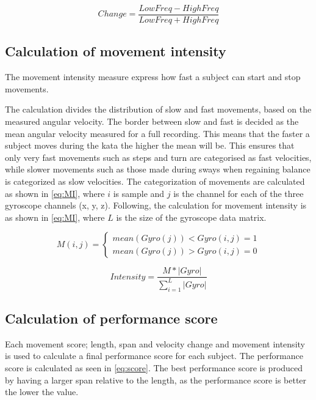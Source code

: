 \begin{equation} \label{eq:VC}
Change = \frac{LowFreq-HighFreq}{LowFreq+HighFreq}
\end{equation}


\subsection{Calculation of movement intensity}
The movement intensity measure express how fast a subject can start and stop movements. 

The calculation divides the distribution of slow and fast movements, based on the measured angular velocity. The border between slow and fast is decided as the mean angular velocity measured for a full recording. This means that the faster a subject moves during the kata the higher the mean will be. This ensures that only very fast movements such as steps and turn are categorised as fast velocities, while slower movements such as those made during sways when regaining balance is categorized as slow velocities. The categorization of movements are calculated as shown in \eqref{eq:MI}, where $i$ is sample and $j$ is the channel for each of the three gyroscope channels (x, y, z). Following, the calculation for movement intensity is as shown in \eqref{eq:MI}, where $L$ is the size of the gyroscope data matrix.

\begin{equation} \label{eq:category}
M(i,j) = \left \{
\begin{matrix}
{mean(Gyro(j)) < Gyro(i,j) = 1}\\{mean(Gyro(j)) > Gyro(i,j) = 0}
\end{matrix} \right.
\end{equation}



%


\begin{equation} \label{eq:MI}
Intensity = \frac{M*\left| Gyro\right| }{\sum_{i=1}^{L}\left| Gyro\right| }
\end{equation}


\subsection{Calculation of performance score}
Each movement score; length, span and velocity change and movement intensity is used to calculate a final performance score for each subject. 
The performance score is calculated as seen in \eqref{eq:score}. The best performance score is produced by having a larger span relative to the length, as the performance score is better the lower the value. %

